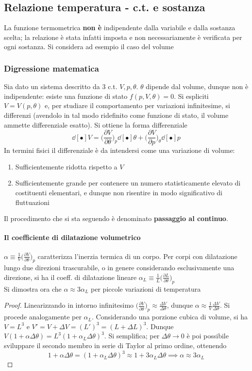 \documentclass[10pt, oneside]{book}
\begin{document}
\subsection{Relazione temperatura - c.t. e sostanza}
La funzione termometrica \textbf{non è} indipendente dalla variabile e dalla sostanza scelta; la relazione è stata infatti imposta e non necessariamente è verificata per ogni sostanza. Si considera ad esempio il caso del volume

\subsubsection*{Digressione matematica} 
Sia dato un sistema descritto da 3 c.t. $V, p, \theta$. $\theta$ dipende dal volume, dunque non è indipendente: esiste una funzione di stato $f (p,V,\theta) = 0$. Si espliciti $V = V(p, \theta)$ e, per studiare il comportamento per variazioni infinitesime, si differenzi (avendolo in tal modo ridefinito come funzione di stato, il volume ammette differenziale esatto). Si ottiene la forma differenziale
\[\dd[•]{V} = \bigg(\frac{\partial V}{\partial \theta}\bigg)_p \dd[•]{\theta} + \bigg(\frac{\partial V}{\partial p}\bigg)_\theta \dd[•]{p}\]
In termini fisici il differenziale è da intendersi come una variazione di volume:
\begin{enumerate}
\item Sufficientemente ridotta rispetto a $V$
\item Sufficientemente grande per contenere un numero statisticamente elevato di costituenti elementari, e dunque non risentire in modo significativo di fluttuazioni
\end{enumerate}
Il procedimento che si sta seguendo è denominato \textbf{passaggio al continuo}.
\paragraph{Il coefficiente di dilatazione volumetrico} $\displaystyle \alpha \equiv \frac{1}{V} \bigg(\frac{\partial V}{\partial \theta}\bigg)_p$ caratterizza l'inerzia termica di un corpo. Per corpi con dilatazione lungo due direzioni trascurabile, o in genere considerando esclusivamente una direzione, si ha il coeff. di dilatazione lineare $\displaystyle \alpha_L \equiv \frac{1}{L}\bigg(\frac{\partial L}{\partial \theta}\bigg)_p$
\\Si dimostra ora che $\alpha \approx 3 \alpha_L$ per piccole variazioni di temperatura
\begin{proof}
Linearizzando in intorno infinitesimo $\displaystyle \bigg(\frac{\partial V}{\partial \theta}\bigg)_p \approx \frac{\Delta V}{\Delta \theta}$, dunque $\alpha \approx \frac{1}{V} \frac{\Delta V}{\Delta \theta}$. Si procede analogamente per $\alpha_L$. Considerando una porzione cubica di volume, si ha $V = L^3$ e $V' = V + \Delta V = (L')^3 = (L + \Delta L)^3$. Dunque $\displaystyle V ( 1 + \alpha \Delta \theta) = L^3 (1 + \alpha_L \Delta \theta)^3$. Si semplifica; per $\Delta \theta \rightarrow 0$ è poi possibile sviluppare il secondo membro in serie di Taylor al primo ordine, ottenendo
\[1 + \alpha \Delta \theta = (1 + \alpha_L \Delta \theta)^3 \approx 1 + 3 \alpha_L \Delta \theta \implies \alpha \approx 3 \alpha_L\]
\end{proof}
\end{document}
